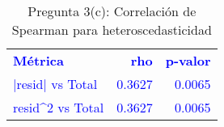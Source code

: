 \begin{table}[H]
\centering
\caption{Pregunta 3(c): Correlación de Spearman para heteroscedasticidad}
\label{tab:q3c_spearman}
\begin{tabular}{lrr}
\rowcolor{blue!10}
\toprule
\rowcolor{blue!20}
\textcolor{blue}{\textbf{Métrica}} & \textcolor{blue}{\textbf{rho}} & \textcolor{blue}{\textbf{p-valor}} \\
\addlinespace
\rowcolor{blue!10}
\textcolor{blue}{|resid| vs Total} & \textcolor{blue}{0.3627} & \textcolor{blue}{0.0065} \\
\rowcolor{blue!10}
\textcolor{blue}{resid\textasciicircum 2 vs Total} & \textcolor{blue}{0.3627} & \textcolor{blue}{0.0065} \\
\bottomrule
\end{tabular}
\end{table}
